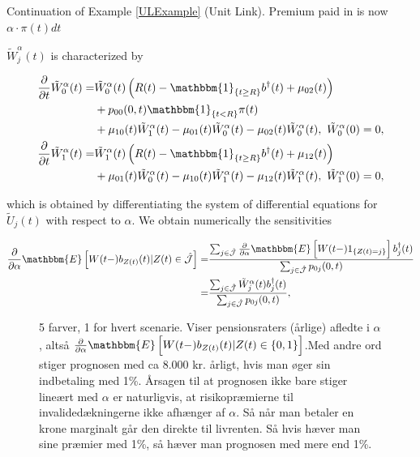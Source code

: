 \documentclass{book}
\newcommand{\1}[1]{\mathbbm{1}_{\left\lbrace #1 \right\rbrace}}
\newcommand{\expec}[1][def]{\mathbbm{E} \left[ #1 \right]}
\theoremstyle{break}
\theoremstyle{remark}
\numberwithin{equation}{section}
\begin{document}
\begin{example}
Continuation of Example \ref{ULExample} (Unit Link). Premium paid in is now $\alpha \cdot \pi(t)dt$

$\tilde{W}_j^\alpha(t)$ is characterized by

\begin{align*}
\frac{\partial}{\partial t} \tilde{W}_0^\alpha(t) =& \tilde{W}_0^\alpha(t) \left( R(t) - \1{t \geq R} b^\dagger(t) + \mu_{02}(t) \right) \\
&+ p_{00}(0,t) \1{t<R} \pi(t) \\
&+ \mu_{10}(t) \tilde{W}_1^\alpha(t) - \mu_{01}(t) \tilde{W}_0^\alpha(t) - \mu_{02}(t) \tilde{W}_0^\alpha(t), \, \, \tilde{W}_0^\alpha(0) = 0, \\
\frac{\partial}{\partial t} \tilde{W}_1^\alpha(t) =& \tilde{W}_1^\alpha(t) \left( R(t) - \1{t \geq R} b^\dagger(t) + \mu_{12}(t) \right) \\
&+ \mu_{01}(t) \tilde{W}_0^\alpha(t) - \mu_{10}(t) \tilde{W}_1^\alpha(t) - \mu_{12}(t) \tilde{W}_1^\alpha(t), \, \, \tilde{W}_1^\alpha(0) = 0,
\end{align*}

which is obtained by differentiating the system of differential equations for $\tilde{U}_j(t)$ with respect to $\alpha$. We obtain numerically the sensitivities

\begin{align*}
\frac{\partial}{\partial \alpha} \expec[W(t-) b_{Z(t)}(t) | Z(t) \in \hat{\mathcal{J}}] =& \frac{\sum_{j \in \hat{\mathcal{J}}} \frac{\partial}{\partial \alpha} \expec[W(t-) 1_{\{Z(t)=j\}}] b_j^{\dagger}(t)}{\sum_{j \in \hat{\mathcal{J}}} p_{0j}(0,t)} \\
=& \frac{\sum_{j \in \hat{\mathcal{J}}} \tilde{W}_j^\alpha(t) b_j^{\dagger}(t)}{\sum_{j \in \hat{\mathcal{J}}} p_{0j}(0,t)},
\end{align*}

\begin{figure}[H]
	\caption{5 farver, 1 for hvert scenarie. Viser pensionsraters (årlige) afledte i $\alpha$, altså $\frac{\partial}{\partial \alpha} \expec[W(t-) b_{Z(t)}(t) | Z(t) \in \{0,1\}]$.Med andre ord stiger prognosen med ca 8.000 kr. årligt, hvis man øger sin indbetaling med 1\%. Årsagen til at prognosen ikke bare stiger lineært med $\alpha$ er naturligvis, at risikopræmierne til invalidedækningerne ikke afhænger af $\alpha$. Så når man betaler en krone marginalt går den direkte til livrenten. Så hvis hæver man sine præmier med 1\%, så hæver man prognosen med mere end 1\%.}
\end{figure}


\end{example}
\end{document}
